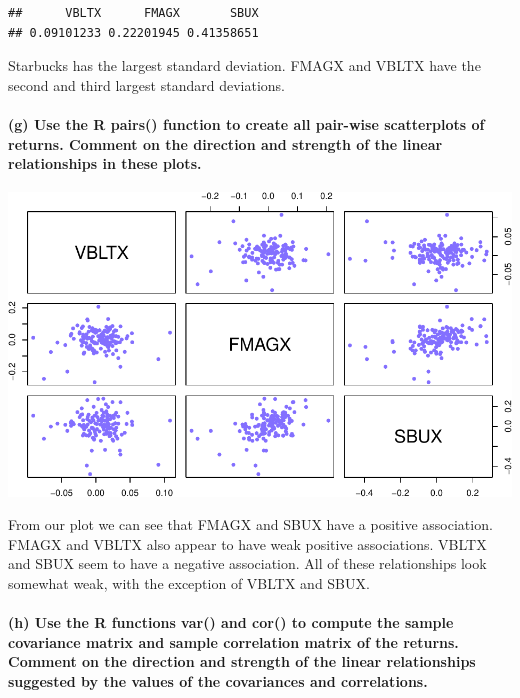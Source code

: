 \documentclass[]{article}
\let\oldparagraph\paragraph
\renewcommand{\paragraph}[1]{\oldparagraph{#1}\mbox{}}
\begin{document}
\begin{verbatim}
##      VBLTX      FMAGX       SBUX 
## 0.09101233 0.22201945 0.41358651
\end{verbatim}

Starbucks has the largest standard deviation. FMAGX and VBLTX have the
second and third largest standard deviations.

\paragraph{(g) Use the R pairs() function to create all pair-wise
scatterplots of returns. Comment on the direction and strength of the
linear relationships in these
plots.}\label{g-use-the-r-pairs-function-to-create-all-pair-wise-scatterplots-of-returns.-comment-on-the-direction-and-strength-of-the-linear-relationships-in-these-plots.}

\includegraphics{homework_4_markdown_files/figure-latex/unnamed-chunk-11-1.pdf}

From our plot we can see that FMAGX and SBUX have a positive
association. FMAGX and VBLTX also appear to have weak positive
associations. VBLTX and SBUX seem to have a negative association. All of
these relationships look somewhat weak, with the exception of VBLTX and
SBUX.

\paragraph{(h) Use the R functions var() and cor() to compute the sample
covariance matrix and sample correlation matrix of the returns. Comment
on the direction and strength of the linear relationships suggested by
the values of the covariances and
correlations.}\label{h-use-the-r-functions-var-and-cor-to-compute-the-sample-covariance-matrix-and-sample-correlation-matrix-of-the-returns.-comment-on-the-direction-and-strength-of-the-linear-relationships-suggested-by-the-values-of-the-covariances-and-correlations.}
\end{document}
